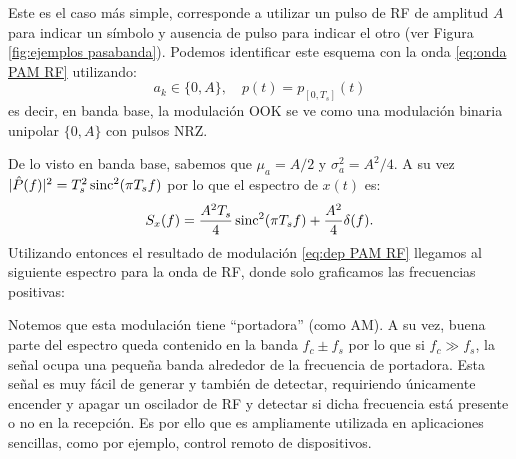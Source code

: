 \begin{ejemplo}
    Este es el caso más simple, corresponde a utilizar un pulso de RF de amplitud $A$ para indicar un símbolo y ausencia de pulso para indicar el otro (ver Figura \ref{fig:ejemplos pasabanda}). Podemos identificar este esquema con la onda \eqref{eq:onda PAM RF} utilizando:
    \begin{equation*}
        a_k \in \{0,A\}, \quad p(t)=p_{[0,T_s]}(t)
    \end{equation*}
    es decir, en banda base, la modulación OOK se ve como una modulación binaria unipolar $\{0,A\}$ con pulsos NRZ.

    De lo visto en banda base, sabemos que $\mu_a = A/2$ y $\sigma_a^2=A^2/4$. A su vez $|\hat{P}(f)|^2= T_s^2 \operatorname{sinc}^2(\pi T_s f)$ por lo que el espectro de $x(t)$ es:
    \begin{equation*}
        S_x(f) = \frac{A^2 T_s}{4} \operatorname{sinc}^2(\pi T_s f) + \frac{A^2}{4}\delta(f).
    \end{equation*}
    Utilizando entonces el resultado de modulación \eqref{eq:dep PAM RF} llegamos al siguiente espectro para la onda de RF, donde solo graficamos las frecuencias positivas:

    \begin{center}
    \end{center}

    Notemos que esta modulación tiene ``portadora'' (como AM). A su vez, buena parte del espectro queda contenido en la banda $f_c\pm f_s$ por lo que si $f_c\gg f_s$, la señal ocupa una pequeña banda alrededor de la frecuencia de portadora. Esta señal es muy fácil de generar y también de detectar, requiriendo únicamente encender y apagar un oscilador de RF y detectar si dicha frecuencia está presente o no en la recepción. Es por ello que es ampliamente utilizada en aplicaciones sencillas, como por ejemplo, control remoto de dispositivos.
\end{ejemplo}


